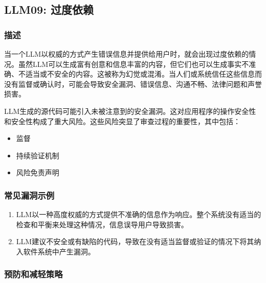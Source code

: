 \documentclass[
]{article}
\author{}
\date{}
\providecommand{\tightlist}{%
  \setlength{\itemsep}{0pt}\setlength{\parskip}{0pt}}
\begin{document}
\subsection{LLM09: 过度依赖}\label{llm09-ux8fc7ux5ea6ux4f9dux8d56}

\subsubsection{描述}\label{ux63cfux8ff0}

当一个LLM以权威的方式产生错误信息并提供给用户时，就会出现过度依赖的情况。虽然LLM可以生成富有创意和信息丰富的内容，但它们也可以生成事实不准确、不适当或不安全的内容。这被称为幻觉或混淆。当人们或系统信任这些信息而没有监督或确认时，可能会导致安全漏洞、错误信息、沟通不畅、法律问题和声誉损害。

LLM生成的源代码可能引入未被注意到的安全漏洞。这对应用程序的操作安全性和安全性构成了重大风险。这些风险突显了审查过程的重要性，其中包括：

\begin{itemize}
\tightlist
\item
  监督
\item
  持续验证机制
\item
  风险免责声明
\end{itemize}

\subsubsection{常见漏洞示例}\label{ux5e38ux89c1ux6f0fux6d1eux793aux4f8b}

\begin{enumerate}
\def\labelenumi{\arabic{enumi}.}
\tightlist
\item
  LLM以一种高度权威的方式提供不准确的信息作为响应。整个系统没有适当的检查和平衡来处理这种情况，信息误导用户导致损害。
\item
  LLM建议不安全或有缺陷的代码，导致在没有适当监督或验证的情况下将其纳入软件系统中产生漏洞。
\end{enumerate}

\subsubsection{预防和减轻策略}\label{ux9884ux9632ux548cux51cfux8f7bux7b56ux7565}
\end{document}
